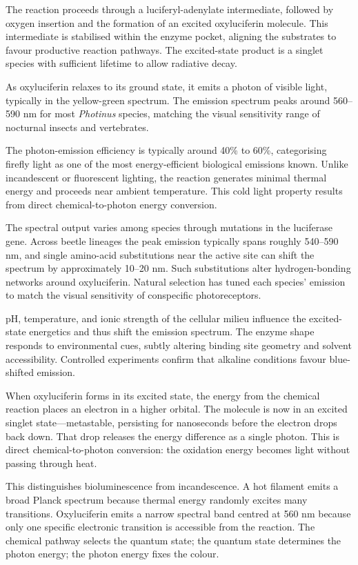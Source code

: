 The reaction proceeds through a luciferyl-adenylate intermediate, followed by oxygen insertion and the formation of an excited oxyluciferin molecule. This intermediate is stabilised within the enzyme pocket, aligning the substrates to favour productive reaction pathways. The excited-state product is a singlet species with sufficient lifetime to allow radiative decay.

As oxyluciferin relaxes to its ground state, it emits a photon of visible light, typically in the yellow-green spectrum. The emission spectrum peaks around 560–590 nm for most \emph{Photinus} species, matching the visual sensitivity range of nocturnal insects and vertebrates.

The photon-emission efficiency is typically around 40\% to 60\%, categorising firefly light as one of the most energy-efficient biological emissions known. Unlike incandescent or fluorescent lighting, the reaction generates minimal thermal energy and proceeds near ambient temperature. This \QSOpen{}cold light\QSClose{} property results from direct chemical-to-photon energy conversion.

The spectral output varies among species through mutations in the luciferase gene. Across beetle lineages the peak emission typically spans roughly 540–590 nm, and single amino-acid substitutions near the active site can shift the spectrum by approximately 10–20 nm. Such substitutions alter hydrogen-bonding networks around oxyluciferin. Natural selection has tuned each species' emission to match the visual sensitivity of conspecific photoreceptors.

pH, temperature, and ionic strength of the cellular milieu influence the excited-state energetics and thus shift the emission spectrum. The enzyme shape responds to environmental cues, subtly altering binding site geometry and solvent accessibility. Controlled experiments confirm that alkaline conditions favour blue-shifted emission.

When oxyluciferin forms in its excited state, the energy from the chemical reaction places an electron in a higher orbital. The molecule is now in an excited singlet state—metastable, persisting for nanoseconds before the electron drops back down. That drop releases the energy difference as a single photon. This is direct chemical-to-photon conversion: the oxidation energy becomes light without passing through heat.

This distinguishes bioluminescence from incandescence. A hot filament emits a broad Planck spectrum because thermal energy randomly excites many transitions. Oxyluciferin emits a narrow spectral band centred at 560 nm because only one specific electronic transition is accessible from the reaction. The chemical pathway selects the quantum state; the quantum state determines the photon energy; the photon energy fixes the colour.

